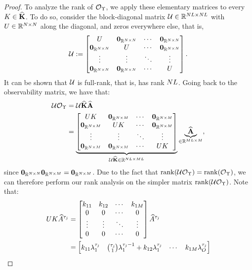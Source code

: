 \begin{proof}
	To analyze the rank of $\mathcal{O}_{\Upsilon}$, we apply these elementary matrices to every $K\in\widehat{\mathbf{K}}$. To do so, consider the block-diagonal matrix $\mathcal{U}\in\mathbb{R}^{NL\times NL}$ with $U\in\mathbb{R}^{N\times N}$ along the diagonal, and zeros everywhere else,
	that is,
	\begin{align}
	\mathcal{U}:= \begin{bmatrix}
	U   & \mathbf{0}_{\mathbb{R}^{N\times N}} & \cdots & \mathbf{0}_{\mathbb{R}^{N\times N}}\\
	\mathbf{0}_{\mathbb{R}^{N\times N}} & U   & \cdots & \mathbf{0}_{\mathbb{R}^{N\times N}}\\
	\vdots  & \vdots  & \ddots & \vdots\\
	\mathbf{0}_{\mathbb{R}^{N\times N}} & \mathbf{0}_{\mathbb{R}^{N\times N}} & \cdots & U
	\end{bmatrix}.
	\end{align}
	It can be shown that  $\mathcal{U}$ is full-rank, that is, has rank $NL$. Going back to the observability matrix, we have that:
	\begin{align*}
	\mathcal{U}\mathcal{O}_{\Upsilon} &= \mathcal{U}\widehat{\mathbf{K}}\widehat{\mathbf{A}}\\
	&=  
	\underbrace{
		\begin{bmatrix}
		UK   & \mathbf{0}_{\mathbb{R}^{N\times M}} & \cdots & \mathbf{0}_{\mathbb{R}^{N\times M}}\\
		\mathbf{0}_{\mathbb{R}^{N\times M}} & UK   & \cdots & \mathbf{0}_{\mathbb{R}^{N\times M}}\\
		\vdots  & \vdots  & \ddots & \vdots\\
		\mathbf{0}_{\mathbb{R}^{N\times M}} & \mathbf{0}_{\mathbb{R}^{N\times M}} & \cdots & UK
		\end{bmatrix}}_{\mathcal{U}\widehat{\mathbf{K}}\in\mathbb{R}^{NL\times ML}}
	\underbrace{\widehat{\mathbf{A}}}_{\in\mathbb{R}^{ML\times M}},
	\end{align*}
	since $\mathbf{0}_{\mathbb{R}^{N\times N}}\mathbf{0}_{\mathbb{R}^{N\times M}} = \mathbf{0}_{\mathbb{R}^{N\times M}}$. Due to the fact that $\operatorname{rank}(\mathcal{U}\mathcal{O}_{\Upsilon}) = \operatorname{rank}(\mathcal{O}_{\Upsilon})$,
	we can therefore perform our rank analysis on the simpler matrix $\operatorname{rank}(\mathcal{U}\mathcal{O}_{\Upsilon})$. Note that:
	\begin{align*}
	UK \widehat{A}^{\tau_j} &=  
	\begin{bmatrix}
	k_{11} & k_{12} & \cdots & k_{1M}\\
	0 & 0 & \cdots & 0\\
	\vdots & \vdots & \ddots & \vdots\\
	0 & 0 & \cdots & 0
	\end{bmatrix}
	\widehat{A}^{\tau_j}\\
	&= 
	\begin{bmatrix}
	k_{11}\lambda_1^{\tau_j} & \binom{\tau_j}{1}\lambda_1^{\tau_j-1} + k_{12}\lambda_1^{\tau_j}  & \cdots & k_{1M}\lambda_{O}^{\tau_j}\\

\end{bmatrix}
\end{align*}
\end{proof}
